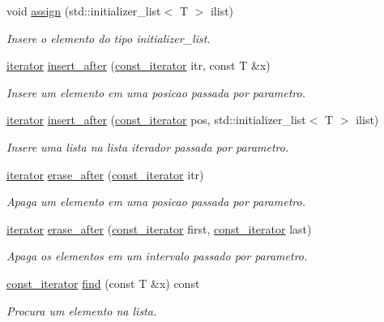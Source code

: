\begin{DoxyCompactItemize}
void \hyperlink{class_forward__list_a53efa28f4498425a08b2ef2f63bd9907}{assign} (std\+::initializer\+\_\+list$<$ T $>$ ilist)
\begin{DoxyCompactList}\small\item\em Insere o elemento do tipo initializer\+\_\+list. \end{DoxyCompactList}\item 
\hyperlink{class_forward__list_1_1iterator}{iterator} \hyperlink{class_forward__list_a5514b9b2cd9bd335e427a5723a4f1e4c}{insert\+\_\+after} (\hyperlink{class_forward__list_1_1const__iterator}{const\+\_\+iterator} itr, const T \&x)
\begin{DoxyCompactList}\small\item\em Insere um elemento em uma posicao passada por parametro. \end{DoxyCompactList}\item 
\hyperlink{class_forward__list_1_1iterator}{iterator} \hyperlink{class_forward__list_af509938caeb03b51e3308a506fc4b66f}{insert\+\_\+after} (\hyperlink{class_forward__list_1_1const__iterator}{const\+\_\+iterator} pos, std\+::initializer\+\_\+list$<$ T $>$ ilist)
\begin{DoxyCompactList}\small\item\em Insere uma lista na lista iterador passada por parametro. \end{DoxyCompactList}\item 
\hyperlink{class_forward__list_1_1iterator}{iterator} \hyperlink{class_forward__list_ae9fd9be0427275ec96a138fe88d9bbce}{erase\+\_\+after} (\hyperlink{class_forward__list_1_1const__iterator}{const\+\_\+iterator} itr)
\begin{DoxyCompactList}\small\item\em Apaga um elemento em uma posicao passada por parametro. \end{DoxyCompactList}\item 
\hyperlink{class_forward__list_1_1iterator}{iterator} \hyperlink{class_forward__list_ac995fdf90fbd2a22976ba8cede63d3f7}{erase\+\_\+after} (\hyperlink{class_forward__list_1_1const__iterator}{const\+\_\+iterator} first, \hyperlink{class_forward__list_1_1const__iterator}{const\+\_\+iterator} last)
\begin{DoxyCompactList}\small\item\em Apaga os elementos em um intervalo passado por parametro. \end{DoxyCompactList}\item 
\hyperlink{class_forward__list_1_1const__iterator}{const\+\_\+iterator} \hyperlink{class_forward__list_a206b61948c4df18b4ab32071bbc1829c}{find} (const T \&x) const 
\begin{DoxyCompactList}\small\item\em Procura um elemento na lista. \end{DoxyCompactList}\end{DoxyCompactItemize}



